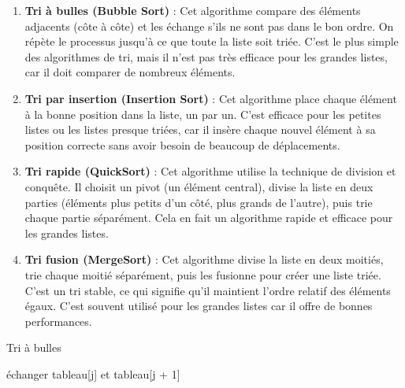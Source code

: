 \begin{enumerate}
		\item \textbf{Tri à bulles (Bubble Sort)} : Cet algorithme compare des éléments adjacents (côte à côte) et les échange s'ils ne sont pas dans le bon ordre. On répète le processus jusqu'à ce que toute la liste soit triée. C'est le plus simple des algorithmes de tri, mais il n'est pas très efficace pour les grandes listes, car il doit comparer de nombreux éléments.
	
	\item \textbf{Tri par insertion (Insertion Sort)} : Cet algorithme place chaque élément à la bonne position dans la liste, un par un. C'est efficace pour les petites listes ou les listes presque triées, car il insère chaque nouvel élément à sa position correcte sans avoir besoin de beaucoup de déplacements.

	
	\item \textbf{Tri rapide (QuickSort)} : Cet algorithme utilise la technique de division et conquête. Il choisit un pivot (un élément central), divise la liste en deux parties (éléments plus petits d'un côté, plus grands de l'autre), puis trie chaque partie séparément. Cela en fait un algorithme rapide et efficace pour les grandes listes.

	
	\item \textbf{Tri fusion (MergeSort)} : Cet algorithme divise la liste en deux moitiés, trie chaque moitié séparément, puis les fusionne pour créer une liste triée. C'est un tri stable, ce qui signifie qu'il maintient l'ordre relatif des éléments égaux. C'est souvent utilisé pour les grandes listes car il offre de bonnes performances.

	
\end{enumerate}


\begin{algorithm}
	\caption{Tri à bulles}
	\label{bulles}
	\begin{algorithmic}[1]
		\State échanger tableau[j] et tableau[j + 1]
		\EndIf
		\EndFor
		\EndFor
		\EndWhile
	\end{algorithmic}
\end{algorithm}

